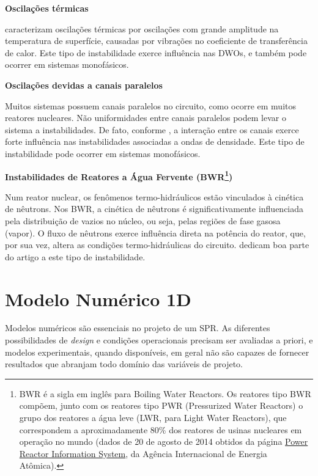 \documentclass[a4paper,portuguese,10pt]{article}
\begin{document}
\textbf{Oscilações térmicas}

\citet{VIJAYAN05b} caracterizam oscilações térmicas por oscilações com grande amplitude na temperatura de superfície, causadas por vibrações no coeficiente de transferência de calor. Este tipo de instabilidade exerce influência nas DWOs, e também pode ocorrer em sistemas monofásicos.

\textbf{Oscilações devidas a canais paralelos}

Muitos sistemas possuem canais paralelos no circuito, como ocorre em muitos reatores nucleares. Não uniformidades entre canais paralelos podem levar o sistema a instabilidades. De fato, conforme \citet{PRASAD07}, a interação entre os canais exerce forte influência nas instabilidades associadas a ondas de densidade. Este tipo de instabilidade pode ocorrer em sistemas monofásicos.

\textbf{Instabilidades de Reatores a Água Fervente (BWR\footnote{BWR é a sigla em inglês para Boiling Water Reactors. Os reatores tipo BWR compõem, junto com os reatores tipo PWR (Pressurized Water Reactors) o grupo dos reatores a água leve (LWR, para Light Water Reactors), que correspondem a aproximadamente 80\% dos reatores de usinas nucleares em operação no mundo (dados de 20 de agosto de 2014 obtidos da página \href{http://www.iaea.org/PRIS/WorldStatistics/OperationalReactorsByType.aspx}{Power Reactor Information System}, da Agência Internacional de Energia Atômica).})}

Num reator nuclear, os fenômenos termo-hidráulicos estão vinculados à cinética de nêutrons. Nos BWR, a cinética de nêutrons é significativamente influenciada pela distribuição de vazios no núcleo, ou seja, pelas regiões de fase gasosa (vapor). O fluxo de nêutrons exerce influência direta na potência do reator, que, por sua vez, altera as condições termo-hidráulicas do circuito. \citet{VIJAYAN05b} dedicam boa parte do artigo a este tipo de instabilidade.

\section{Modelo Numérico 1D\label{sec_modelo}}

Modelos numéricos são essenciais no projeto de um SPR. As diferentes possibilidades de {\it design} e condições operacionais precisam ser avaliadas a priori, e modelos experimentais, quando disponíveis, em geral não são capazes de fornecer resultados que abranjam todo domínio das variáveis de projeto.
\end{document}
